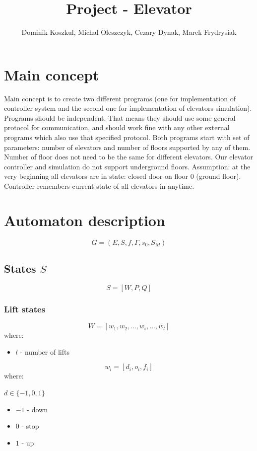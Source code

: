 \documentclass[12pt]{article}
\title{Project - Elevator} %
\author{Dominik Koszkul, Michal Oleszczyk, Cezary Dynak, Marek Frydrysiak } %
\begin{document}
\maketitle %


\section{Main concept}
	Main concept is to create two different programs (one for implementation of controller system and the second one for implementation of elevators simulation). Programs should be independent. That means they should use some general protocol for communication, and should work fine with any other external programs which also use that specified protocol. Both programs start with set of parameters: number of elevators and number of floors supported by any of them. Number of floor does not need to be the same for different elevators. Our elevator controller and simulation do not support underground floors.
\newline
\newline
Assumption: at the very beginning all elevators are in state: closed door on floor 0 (ground floor). Controller remembers current state of all elevators in anytime.

\section{Automaton description}

\[ G = (E, S, f, \Gamma, s_0, S_M) \]

\subsection{States \(S\)}

\[ S = [W, P, Q] \]

\subsubsection{Lift states}

\[ W=[w_1, w_2, ..., w_i, ..., w_l ]\]
where:
\begin{itemize}
  \item \(l\) - number of lifts
\end{itemize}

\[ w_i = [d_i, o_i, f_i] \]
where:

\(d \in \{-1,0,1\}\)
\begin{itemize}
  \item \(-1\) - down
  \item \(0\) - stop
  \item \(1\) - up
\end{itemize}
\end{document}
